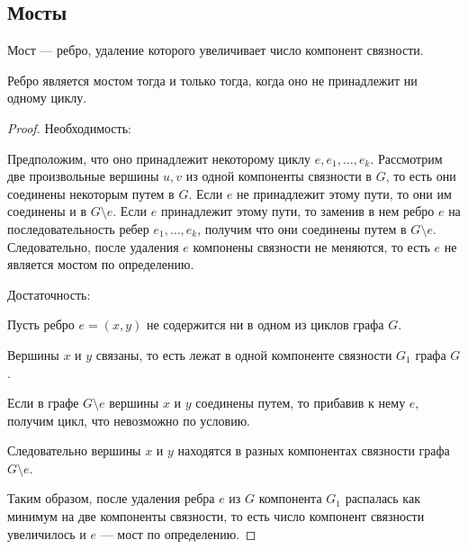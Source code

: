 \subsection{Мосты}

\begin{defn}
    Мост --- ребро, удаление которого увеличивает число компонент связности.
\end{defn}

\begin{theorem}[о мостах]
    
    Ребро является мостом тогда и только тогда, когда оно не принадлежит ни одному циклу.
\end{theorem}

\begin{proof}
    
    Необходимость:
    
    Предположим, что оно принадлежит некоторому циклу $e, e_1, \ldots, e_k$. Рассмотрим две произвольные вершины $u, v$ из одной компоненты связности в $G$, то есть они соединены некоторым путем в $G$. Если $e$ не принадлежит этому пути, то они им соединены и в $G \setminus e$.
    Если $e$ принадлежит этому пути, то заменив в нем ребро $e$ на последовательность ребер $e_1, \ldots, e_k$, получим что они соединены путем в $G \setminus e$.
    Следовательно, после удаления $e$ компонены связности не меняются, то есть $e$ не является мостом по определению.

    Достаточность:

    Пусть ребро $e = (x, y)$ не содержится ни в одном из циклов графа $G$.

    Вершины $x$ и $y$ связаны, то есть лежат в одной компоненте связности $G_1$ графа $G$.

    Если в графе $G \setminus e$ вершины $x$ и $y$ соединены путем, то прибавив к нему $e$, получим цикл, что невозможно по условию.

    Следовательно вершины $x$ и $y$ находятся в разных компонентах связности графа $G \setminus e$.

    Таким образом, после удаления ребра $e$ из $G$ компонента $G_1$ распалась как минимум на две компоненты связности, то есть число компонент связности увеличилось и $e$ --- мост по определению.
\end{proof}